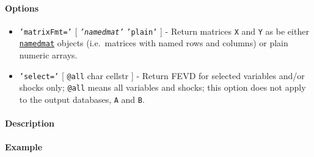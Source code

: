 \paragraph{Options}\label{options}

\begin{itemize}
\item
  \texttt{'matrixFmt='} {[} \emph{\texttt{'namedmat'}} \textbar{}
  \texttt{'plain'} {]} - Return matrices \texttt{X} and \texttt{Y} as be
  either \href{namedmat/Contents}{\texttt{namedmat}} objects
  (i.e.~matrices with named rows and columns) or plain numeric arrays.
\item
  \texttt{'select='} {[} \texttt{@all} \textbar{} char \textbar{}
  cellstr {]} - Return FEVD for selected variables and/or shocks only;
  \texttt{@all} means all variables and shocks; this option does not
  apply to the output databases, \texttt{A} and \texttt{B}.
\end{itemize}

\paragraph{Description}\label{description}

\paragraph{Example}\label{example}


